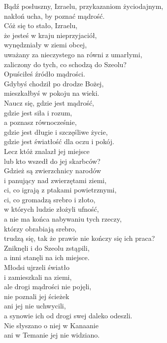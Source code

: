 \documentclass[10pt,a5paper]{book}
\begin{document}
\noindent Bądź posłuszny, Izraelu, przykazaniom życiodajnym, \\
nakłoń ucha, by poznać mądrość. \\
Cóż się to stało, Izraelu, \\
że jesteś w kraju nieprzyjaciół, \\
wynędzniały w ziemi obcej, \\
uważany za nieczystego na równi z umarłymi, \\
zaliczony do tych, co schodzą do Szeolu? \\
Opuściłeś źródło mądrości. \\
Gdybyś chodził po drodze Bożej, \\
mieszkałbyś w pokoju na wieki. \\
Naucz się, gdzie jest mądrość, \\
gdzie jest siła i rozum, \\
a poznasz równocześnie, \\
gdzie jest długie i szczęśliwe życie, \\
gdzie jest światłość dla oczu i pokój. \\
Lecz któż znalazł jej miejsce \\
lub kto wszedł do jej skarbców? \\
Gdzież są zwierzchnicy narodów \\
i panujący nad zwierzętami ziemi, \\
ci, co igrają z ptakami powietrznymi, \\
ci, co gromadzą srebro i złoto, \\
w których ludzie złożyli ufność, \\
a nie ma końca nabywaniu tych rzeczy, \\
którzy obrabiają srebro, \\
trudzą się, tak że prawie nie kończy się ich praca? \\
Zniknęli i do Szeolu zstąpili, \\
a inni stanęli na ich miejsce. \\
Młodsi ujrzeli światło \\
i zamieszkali na ziemi, \\
ale drogi mądrości nie pojęli, \\
nie poznali jej ścieżek \\
ani jej nie uchwycili, \\
a synowie ich od drogi swej daleko odeszli. \\
Nie słyszano o niej w Kanaanie\\
ani w Temanie jej nie widziano. \\
\end{document}
